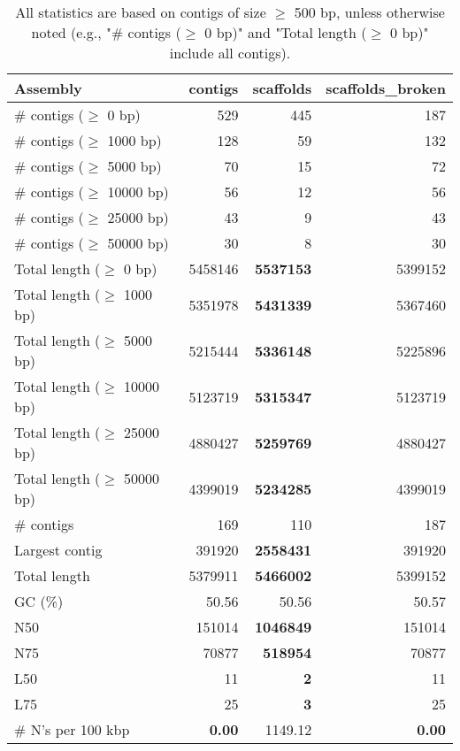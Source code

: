\documentclass[12pt,a4paper]{article}
\begin{document}
\begin{table}[ht]
\begin{center}
\caption{All statistics are based on contigs of size $\geq$ 500 bp, unless otherwise noted (e.g., "\# contigs ($\geq$ 0 bp)" and "Total length ($\geq$ 0 bp)" include all contigs).}
\begin{tabular}{|l*{3}{|r}|}
\hline
Assembly & contigs & scaffolds & scaffolds\_broken \\ \hline
\# contigs ($\geq$ 0 bp) & 529 & 445 & 187 \\ \hline
\# contigs ($\geq$ 1000 bp) & 128 & 59 & 132 \\ \hline
\# contigs ($\geq$ 5000 bp) & 70 & 15 & 72 \\ \hline
\# contigs ($\geq$ 10000 bp) & 56 & 12 & 56 \\ \hline
\# contigs ($\geq$ 25000 bp) & 43 & 9 & 43 \\ \hline
\# contigs ($\geq$ 50000 bp) & 30 & 8 & 30 \\ \hline
Total length ($\geq$ 0 bp) & 5458146 & {\bf 5537153} & 5399152 \\ \hline
Total length ($\geq$ 1000 bp) & 5351978 & {\bf 5431339} & 5367460 \\ \hline
Total length ($\geq$ 5000 bp) & 5215444 & {\bf 5336148} & 5225896 \\ \hline
Total length ($\geq$ 10000 bp) & 5123719 & {\bf 5315347} & 5123719 \\ \hline
Total length ($\geq$ 25000 bp) & 4880427 & {\bf 5259769} & 4880427 \\ \hline
Total length ($\geq$ 50000 bp) & 4399019 & {\bf 5234285} & 4399019 \\ \hline
\# contigs & 169 & 110 & 187 \\ \hline
Largest contig & 391920 & {\bf 2558431} & 391920 \\ \hline
Total length & 5379911 & {\bf 5466002} & 5399152 \\ \hline
GC (\%) & 50.56 & 50.56 & 50.57 \\ \hline
N50 & 151014 & {\bf 1046849} & 151014 \\ \hline
N75 & 70877 & {\bf 518954} & 70877 \\ \hline
L50 & 11 & {\bf 2} & 11 \\ \hline
L75 & 25 & {\bf 3} & 25 \\ \hline
\# N's per 100 kbp & {\bf 0.00} & 1149.12 & {\bf 0.00} \\ \hline
\end{tabular}
\end{center}
\end{table}
\end{document}
